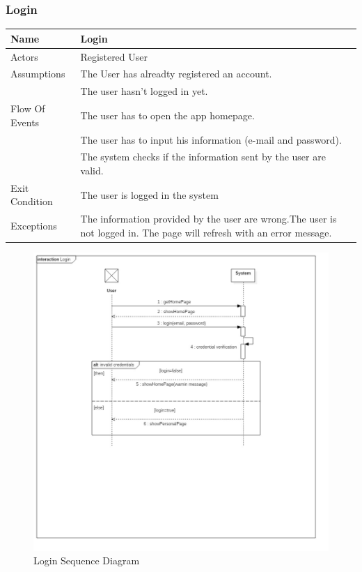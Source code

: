 \documentclass{article}
\begin{document}
\subsubsection{Login}
\begin{center}
\begin{tabular}{| p{3cm} || p{8cm} |}
\hline
Name & Login\\ \hline
Actors & Registered User \\ \hline
Assumptions & The User has alreadty registered an account. \\&The user hasn't logged in yet. \\ \hline
Flow Of Events & The user has to open the app homepage. \\&The user has to input his information (e-mail and password). \\& The system checks if the information sent by the user are valid. \\ \hline
Exit Condition & The user is logged in the system \\ \hline
Exceptions & The information provided by the user are wrong.The user is not logged in. The page will refresh with an error message. \\
\hline
\end{tabular}
\end{center}
\begin{figure}[H]
\includegraphics[width=\linewidth]{Login.jpg}
\caption{Login Sequence Diagram}
\label{fig:SQ2}
\end{figure}
\end{document}
